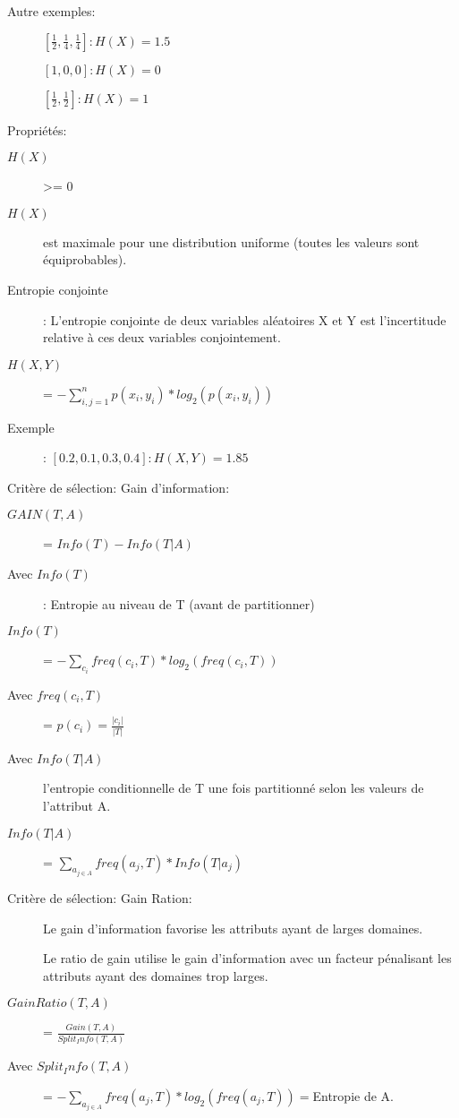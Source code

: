 Autre exemples:
\begin{description}
\item[] $[\frac{1}{2}, \frac{1}{4}, \frac{1}{4}]: H(X) = 1.5$
\item[] $[1, 0, 0]: H(X) = 0$
\item[] $[\frac{1}{2}, \frac{1}{2}]: H(X) = 1$
\end{description}

Propriétés:
\begin{description}
\item[$H(X)$] >= 0
\item[$H(X)$] est maximale pour une distribution uniforme (toutes les valeurs sont équiprobables).
\end{description}

\begin{description}
\item[Entropie conjointe]: L’entropie conjointe de deux variables aléatoires X et Y est l’incertitude relative à ces deux variables conjointement.
\item[$H(X,Y)$] = $- \sum_{i,j=1}^n p(x_i,y_i) * log_2(p(x_i,y_i))$
\item[Exemple]: $[0.2, 0.1, 0.3, 0.4]: H(X,Y) = 1.85$
\end{description}


Critère de sélection: Gain d'information:
\begin{description}
\item[$GAIN(T,A)$] = $Info(T) - Info(T|A)$
\item[Avec $Info(T)$]: Entropie au niveau de T (avant de partitionner)
\item[$Info(T)$] = $-\sum_{c_i} freq(c_i,T)*log_2(freq(c_i,T))$
\item[Avec $freq(c_i,T)$] = $p(c_i) = \frac{|c_i|}{|T|}$
\item[Avec $Info(T|A)$] l'entropie conditionnelle de T une fois partitionné selon les valeurs de l'attribut A.
\item[$Info(T|A)$] = $ \sum_{a_{j \in A}} freq(a_j,T) * Info(T | a_j)$
\end{description}

Critère de sélection: Gain Ration:
\begin{description}
\item[] Le gain d’information favorise les attributs ayant de larges domaines.
\item[] Le ratio de gain utilise le gain d’information avec un facteur pénalisant les attributs ayant des domaines trop larges.
\item[$GainRatio(T,A)$] = $\frac{Gain(T,A)}{Split_Info(T,A)}$
\item[Avec $Split_Info(T,A)$] = $- \sum_{a_{j \in A}} freq(a_j,T)*log_2(freq(a_j,T)) = $Entropie de A.
\end{description}

